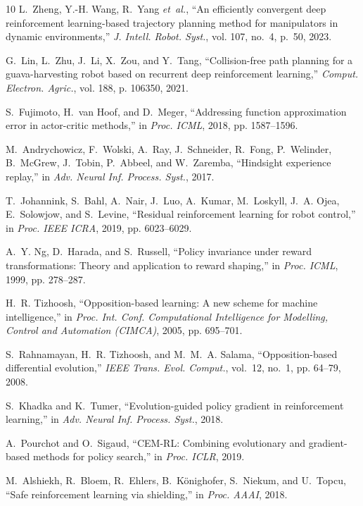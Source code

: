 \documentclass[conference]{IEEEtran}
\begin{document}
\begin{thebibliography}{10}
L.~Zheng, Y.-H. Wang, R.~Yang \emph{et~al.}, ``An efficiently convergent deep
  reinforcement learning-based trajectory planning method for manipulators in
  dynamic environments,'' \emph{J. Intell. Robot. Syst.}, vol. 107, no.~4,
  p.~50, 2023.

G.~Lin, L.~Zhu, J.~Li, X.~Zou, and Y.~Tang, ``Collision-free path planning for
  a guava-harvesting robot based on recurrent deep reinforcement learning,''
  \emph{Comput. Electron. Agric.}, vol. 188, p. 106350, 2021.

S.~Fujimoto, H.~van Hoof, and D.~Meger, ``Addressing function approximation
  error in actor-critic methods,'' in \emph{Proc. ICML}, 2018, pp. 1587--1596.

M.~Andrychowicz, F.~Wolski, A.~Ray, J.~Schneider, R.~Fong, P.~Welinder,
  B.~McGrew, J.~Tobin, P.~Abbeel, and W.~Zaremba, ``Hindsight experience
  replay,'' in \emph{Adv. Neural Inf. Process. Syst.}, 2017.

T.~Johannink, S.~Bahl, A.~Nair, J.~Luo, A.~Kumar, M.~Loskyll, J.~A. Ojea,
  E.~Solowjow, and S.~Levine, ``Residual reinforcement learning for robot
  control,'' in \emph{Proc. IEEE ICRA}, 2019, pp. 6023--6029.

A.~Y. Ng, D.~Harada, and S.~Russell, ``Policy invariance under reward
  transformations: Theory and application to reward shaping,'' in \emph{Proc.
  ICML}, 1999, pp. 278--287.

H.~R. Tizhoosh, ``Opposition-based learning: A new scheme for machine
  intelligence,'' in \emph{Proc. Int. Conf. Computational Intelligence for
  Modelling, Control and Automation (CIMCA)}, 2005, pp. 695--701.

S.~Rahnamayan, H.~R. Tizhoosh, and M.~M.~A. Salama, ``Opposition-based
  differential evolution,'' \emph{IEEE Trans. Evol. Comput.}, vol.~12, no.~1,
  pp. 64--79, 2008.

S.~Khadka and K.~Tumer, ``Evolution-guided policy gradient in reinforcement
  learning,'' in \emph{Adv. Neural Inf. Process. Syst.}, 2018.

A.~Pourchot and O.~Sigaud, ``{CEM-RL}: Combining evolutionary and
  gradient-based methods for policy search,'' in \emph{Proc. ICLR}, 2019.

M.~Alshiekh, R.~Bloem, R.~Ehlers, B.~K\"onighofer, S.~Niekum, and U.~Topcu,
  ``Safe reinforcement learning via shielding,'' in \emph{Proc. AAAI}, 2018.


\end{thebibliography}
\end{document}
